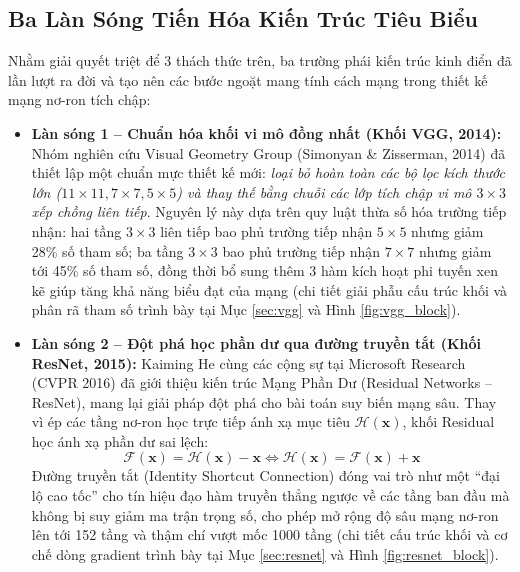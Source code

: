 \documentclass[12pt,a4paper]{report}
\begin{document}
\subsection{Ba Làn Sóng Tiến Hóa Kiến Trúc Tiêu Biểu}
Nhằm giải quyết triệt để 3 thách thức trên, ba trường phái kiến trúc kinh điển đã lần lượt ra đời và tạo nên các bước ngoặt mang tính cách mạng trong thiết kế mạng nơ-ron tích chập:

\begin{itemize}[leftmargin=2em]
    \item \textbf{Làn sóng 1 -- Chuẩn hóa khối vi mô đồng nhất (Khối VGG, 2014):}
    Nhóm nghiên cứu Visual Geometry Group (Simonyan \& Zisserman, 2014) đã thiết lập một chuẩn mực thiết kế mới: \textit{loại bỏ hoàn toàn các bộ lọc kích thước lớn ($11 \times 11, 7 \times 7, 5 \times 5$) và thay thế bằng chuỗi các lớp tích chập vi mô $3 \times 3$ xếp chồng liên tiếp}. Nguyên lý này dựa trên quy luật thừa số hóa trường tiếp nhận: hai tầng $3 \times 3$ liên tiếp bao phủ trường tiếp nhận $5 \times 5$ nhưng giảm 28\% số tham số; ba tầng $3 \times 3$ bao phủ trường tiếp nhận $7 \times 7$ nhưng giảm tới 45\% số tham số, đồng thời bổ sung thêm 3 hàm kích hoạt phi tuyến xen kẽ giúp tăng khả năng biểu đạt của mạng (chi tiết giải phẫu cấu trúc khối và phân rã tham số trình bày tại Mục \ref{sec:vgg} và Hình \ref{fig:vgg_block}).

    \item \textbf{Làn sóng 2 -- Đột phá học phần dư qua đường truyền tắt (Khối ResNet, 2015):}
    Kaiming He cùng các cộng sự tại Microsoft Research (CVPR 2016) đã giới thiệu kiến trúc Mạng Phần Dư (Residual Networks -- ResNet), mang lại giải pháp đột phá cho bài toán suy biến mạng sâu. Thay vì ép các tầng nơ-ron học trực tiếp ánh xạ mục tiêu $\mathcal{H}(\mathbf{x})$, khối Residual học ánh xạ phần dư sai lệch:
    \begin{equation}
        \mathcal{F}(\mathbf{x}) = \mathcal{H}(\mathbf{x}) - \mathbf{x} \iff \mathcal{H}(\mathbf{x}) = \mathcal{F}(\mathbf{x}) + \mathbf{x}
    \end{equation}
    Đường truyền tắt (Identity Shortcut Connection) đóng vai trò như một ``đại lộ cao tốc'' cho tín hiệu đạo hàm truyền thẳng ngược về các tầng ban đầu mà không bị suy giảm ma trận trọng số, cho phép mở rộng độ sâu mạng nơ-ron lên tới 152 tầng và thậm chí vượt mốc 1000 tầng (chi tiết cấu trúc khối và cơ chế dòng gradient trình bày tại Mục \ref{sec:resnet} và Hình \ref{fig:resnet_block}).


\end{itemize}
\end{document}
